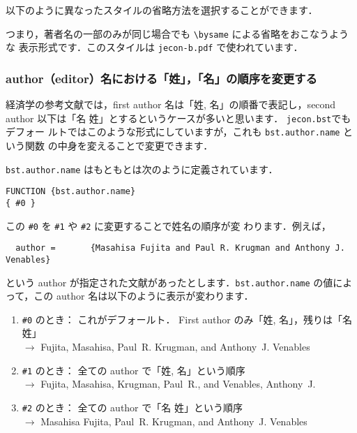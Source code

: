\documentclass[article]{jlreq}
\newcommand{\bysameline}{\hskip.3em \leavevmode\rule[.5ex]{3em}{.3pt}\hskip0.5em}
\begin{document}
以下のように異なったスタイルの省略方法を選択することができます．
\begin{screen}
\end{screen}
つまり，著者名の一部のみが同じ場合でも \verb|\bysame| による省略をおこなうような
表示形式です．このスタイルは \verb|jecon-b.pdf| で使われています．



\vspace*{1em}

\subsubsection{author（editor）名における「姓」，「名」の順序を変更する}

経済学の参考文献では，first author 名は「姓, 名」の順番で表記し，second author
以下は「名 姓」とするというケースが多いと思います．  \texttt{jecon.bst}でもデフォー
ルトではこのような形式にしていますが，これも \texttt{bst.author.name} という関数
の中身を変えることで変更できます．

\texttt{bst.author.name} はもともとは次のように定義されています．
\begin{screen}
\begin{verbatim}
FUNCTION {bst.author.name}
{ #0 }
\end{verbatim}
\end{screen}
この \verb|#0| を \verb|#1| や \verb|#2| に変更することで姓名の順序が変
わります．例えば，
\begin{verbatim}
  author =       {Masahisa Fujita and Paul R. Krugman and Anthony J. Venables}
\end{verbatim}
という author が指定された文献があったとします．\texttt{bst.author.name} 
の値によって，この author 名は以下のように表示が変わります．
\begin{enumerate}
 \item \verb|#0| のとき： これがデフォールト． First author のみ「姓, 
       名」，残りは「名 姓」\\
       $\rightarrow$ Fujita, Masahisa, Paul~R. Krugman, and
       Anthony~J. Venables
 \item \verb|#1| のとき： 全ての author で「姓, 名」という順序\\
       $\rightarrow$ Fujita, Masahisa, Krugman, Paul~R., and Venables, Anthony~J.
 \item \verb|#2| のとき： 全ての author で「名 姓」という順序\\
       $\rightarrow$ Masahisa Fujita, Paul~R. Krugman, and Anthony~J. Venables
\end{enumerate}
\end{document}
